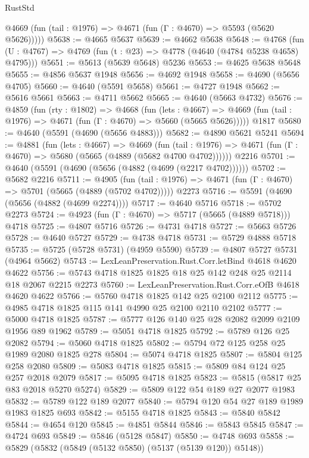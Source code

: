 \begin{lexlean}{RustStd}
\begin{coremodule}
      @4669 (fun (tail : @1976) => @4671 (fun (Γ : @4670) => @5593 (@5620 @5626)))))
@5638 := @4665 @5637
@5639 := @4662 @5638
@5648 := @4768 (fun (U : @4767) => @4769 (fun (t : @23) => @4778 (@4640 (@4784 @5238 @4658) @4795)))
@5651 := @5613 (@5639 @5648) @5236
@5653 := @4625 @5638 @5648
@5655 := @4856 @5637 @1948
@5656 := @4692 @1948
@5658 := @4690 (@5656 @4705)
@5660 := @4640 (@5591 @5658)
@5661 := @4727 @1948
@5662 := @5616 @5661
@5663 := @4711 @5662
@5665 := @4640 (@5663 @4732)
@5676 := @4859
    (fun (rty : @1802) =>
    @4668
      (fun (lets : @4667) =>
      @4669 (fun (tail : @1976) => @4671 (fun (Γ : @4670) => @5660 (@5665 @5626)))))
    @1817
@5680 := @4640 (@5591 (@4690 (@5656 @4883)))
@5682 := @4890 @5621 @5241
@5694 := @4881
    (fun (lets : @4667) =>
    @4669
      (fun (tail : @1976) => @4671 (fun (Γ : @4670) => @5680 (@5665 (@4889 (@5682 @4700 @4702))))))
    @2216
@5701 := @4640 (@5591 (@4690 (@5656 (@4882 (@4699 (@2217 @4702))))))
@5702 := @5682 @2216
@5711 := @4905
    (fun (tail : @1976) => @4671 (fun (Γ : @4670) => @5701 (@5665 (@4889 (@5702 @4702)))))
    @2273
@5716 := @5591 (@4690 (@5656 (@4882 (@4699 @2274))))
@5717 := @4640 @5716
@5718 := @5702 @2273
@5724 := @4923 (fun (Γ : @4670) => @5717 (@5665 (@4889 @5718))) @4718
@5725 := @4807 @5716
@5726 := @4731 @4718
@5727 := @5663 @5726
@5728 := @4640 @5727
@5729 := @4738 @4718
@5731 := @5729 @4888 @5718
@5735 := @5725 (@5728 @5731) (@4959 @5590)
@5739 := @4807 @5727 @5731 (@4964 @5662)
@5743 := LexLeanPreservation.Rust.Corr.letBind @4618 @4620 @4622
@5756 := @5743 @4718 @1825 @1825 @18 @25 @142 @248 @25 @2114 @18 @2067 @2215 @2273
@5760 := LexLeanPreservation.Rust.Corr.eOfB @4618 @4620 @4622
@5766 := @5760 @4718 @1825 @142 @25 @2100 @2112
@5775 := @4985 @4718 @1825 @115 @141 @4990 @25 @2100 @2110 @2102
@5777 := @5000 @4718 @1825
@5787 := @5777 @126 @140 @25 @28 @2082 @2099 @2109 @1956 @89 @1962
@5789 := @5051 @4718 @1825
@5792 := @5789 @126 @25 @2082
@5794 := @5060 @4718 @1825
@5802 := @5794 @72 @125 @258 @25 @1989 @2080 @1825 @278
@5804 := @5074 @4718 @1825
@5807 := @5804 @125 @258 @2080
@5809 := @5083 @4718 @1825
@5815 := @5809 @84 @124 @25 @257 @2018 @2079
@5817 := @5095 @4718 @1825
@5823 := @5815 (@5817 @25 @83 @2018 @5270 @5274)
@5829 := @5809 @122 @54 @189 @27 @2077 @1983
@5832 := @5789 @122 @189 @2077
@5840 := @5794 @120 @54 @27 @189 @1989 @1983 @1825 @693
@5842 := @5155 @4718 @1825
@5843 := @5840 @5842
@5844 := @4654 @120
@5845 := @4851 @5844
@5846 := @5843 @5845
@5847 := @4724 @693
@5849 := @5846 (@5128 @5847)
@5850 := @4748 @693
@5858 := @5829 (@5832 (@5849 (@5132 @5850) (@5137 (@5139 @120)) @5148))

\end{coremodule}
\end{lexlean}
